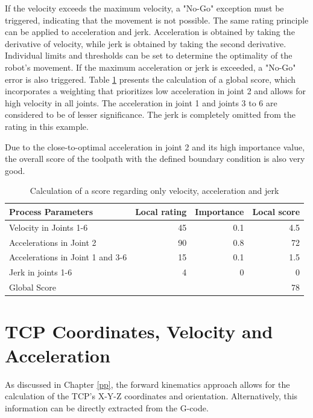 If the velocity exceeds the maximum velocity, a "No-Go" exception must be triggered, indicating that the movement is not possible. The same rating principle can be applied to acceleration and jerk. Acceleration is obtained by taking the derivative of velocity, while jerk is obtained by taking the second derivative. Individual limits and thresholds can be set to determine the optimality of the robot's movement. If the maximum acceleration or jerk is exceeded, a "No-Go" error is also triggered.
\newpage
Table \ref{VAJ} presents the calculation of a global score, which incorporates a weighting that prioritizes low acceleration in joint 2 and allows for high velocity in all joints. The acceleration in joint 1 and joints 3 to 6 are considered to be of lesser significance. The jerk is completely omitted from the rating in this example.

Due to the close-to-optimal acceleration in joint 2 and its high importance value, the overall score of the toolpath with the defined boundary condition is also very good.

\begin{table}[H]
	\centering
	\begin{tabular}{||l|r|r|r||}
		Process Parameters & Local rating & Importance & Local score\\
		\hline
		\hline
		\hline
		Velocity in Joints 1-6& 45& 0.1&4.5\\
		Accelerations in Joint 2& 90 & 0.8 & 72\\
		Accelerations in Joint 1 and 3-6 & 15& 0.1&1.5\\
		Jerk in joints 1-6& 4& 0&0\\
		
		\hline
		\hline
		\hline
		Global Score& & &78\\
		\hline
		\hline
	\end{tabular}
	
	\caption{Calculation of a score regarding only velocity, acceleration and jerk}
	\label{VAJ}
\end{table}


\section{TCP Coordinates, Velocity and Acceleration}\label{CVA}
As discussed in Chapter \ref{pp}, the forward kinematics approach allows for the calculation of the TCP's X-Y-Z coordinates and orientation. Alternatively, this information can be directly extracted from the G-code.

